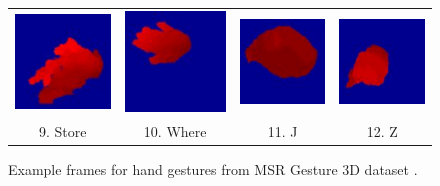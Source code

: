 \documentclass[final,3p,times,twocolumn]{elsarticle}
\begin{document}
\begin{figure}[H]
{\begin{tabular}{cccc}
		         \includegraphics[width=0.22\columnwidth]{Figures/MSRGesture3D_store.pdf} &          \includegraphics[width=0.22\columnwidth]{Figures/MSRGesture3D_where.pdf} &          \includegraphics[width=0.22\columnwidth]{Figures/MSRGesture3D_j.pdf} &          \includegraphics[width=0.22\columnwidth]{Figures/MSRGesture3D_z.pdf} \\
		
		         9. Store &          10. Where &          11. J &          12. Z \\
		
		\end{tabular}  
		
	}
	\caption{Example frames for hand gestures from MSR Gesture 3D dataset \cite{wang2012robust}.}
	\label{Figure_ExampleFrames_MSRGesture3D}
\end{figure}
\end{document}
